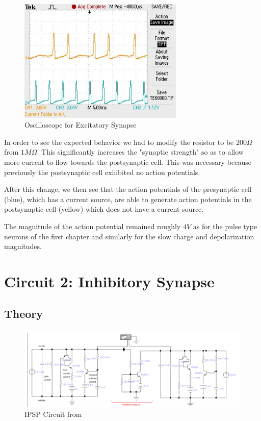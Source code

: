 \documentclass[12]{book}
\newcommand\0{\mathbf{0}}
\newcommand\<{\langle}
\renewcommand\>{\rangle}
\begin{document}
\begin{figure}[h]
\centering
\includegraphics[width=0.7\textwidth]{excitatory.jpg}
\caption{Oscilloscope for Excitatory Synapse}
\end{figure}

In order to see the expected behavior we had to modify the resistor to be $200 \Omega$ from $1 M \Omega$. This significantly increases the "synaptic strength" so as to allow more current to flow towards the postsynaptic cell. This was necessary because previously the postsynaptic cell exhibited no action potentials.

After this change, we then see that the action potentials of the presynaptic cell (blue), which has a current source, are able to generate action potentials in the postsynaptic cell (yellow) which does not have a current source.  

The magnitude of the action potential remained roughly $4V$ as for the pulse type neurons of the first chapter and similarly for the slow charge and depolarization magnitudes.

\section{Circuit 2: Inhibitory Synapse}

\subsection{Theory}

\begin{figure}[h]
\centering
\includegraphics[width=\textwidth]{inhibitory_circuit}	
\caption{IPSP Circuit from \cite{levitan2015neuron}}
\end{figure}
\end{document}
